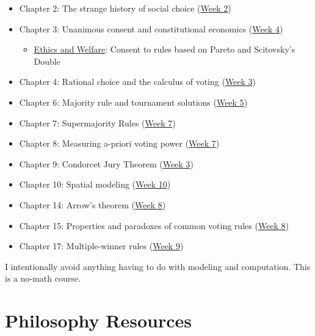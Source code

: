 \begin{itemize}
    \item Chapter 2:  The strange history of social choice (\hyperref[cur:ed-history]{Week 2})

    \item Chapter 3:  Unanimous consent and constitutional economics (\hyperref[cur:collective-decisions-consent]{Week 4})
    \begin{itemize}
        \item \hyperref[cur:ethics]{Ethics and Welfare}:  Consent to rules based on Pareto and Scitovsky's Double
    \end{itemize}

    \item Chapter 4:  Rational choice and the calculus of voting (\hyperref[cur:public-discourse]{Week 3})

    \item Chapter 6:  Majority rule and tournament solutions (\hyperref[cur:majority]{Week 5})

    \item Chapter 7:  Supermajority Rules (\hyperref[cur:representative-democracy]{Week 7})

    \item Chapter 8:  Measuring a-priori voting power (\hyperref[cur:representative-democracy]{Week 7})

    \item Chapter 9:  Condorcet Jury Theorem (\hyperref[cur:public-discourse]{Week 3})
    \item Chapter 10:  Spatial modeling (\hyperref[cur:public-government-structure]{Week 10})

    \item Chapter 14:  Arrow's theorem (\hyperref[cur:single-winner-voting-rules]{Week 8})

    \item Chapter 15:  Properties and paradoxes of common voting rules (\hyperref[cur:single-winner-voting-rules]{Week 8})

    \item Chapter 17:  Multiple-winner rules (\hyperref[cur:multi-winner-voting-rules]{Week 9})

\end{itemize}

I intentionally avoid anything having to do with modeling and computation.  This is a no-math course.

\section{Philosophy Resources}

